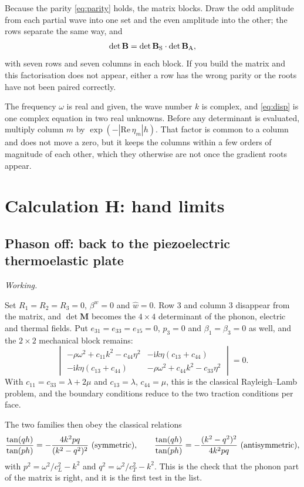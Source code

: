 \documentclass[11pt,a4paper]{article}
\newif\ifshowworked \showworkedtrue
\newenvironment{worked}{\ifshowworked\par\smallskip\noindent\textit{Working.}\par\else\setbox0\vbox\bgroup\fi}{\ifshowworked\par\smallskip\else\egroup\fi}
\newcommand{\ii}{\mathrm{i}}
\newcommand{\bw}{\hat w}
\newcommand{\bwth}{\beta^{w}}
\begin{document}
Because the parity \eqref{eq:parity} holds, the matrix blocks. Draw the odd amplitude from each partial wave
into one set and the even amplitude into the other; the rows separate the same way, and
\begin{equation}\label{eq:factor}
\det\mathbf B=\det\mathbf B_{\rm S}\cdot\det\mathbf B_{\rm A},
\end{equation}
with seven rows and seven columns in each block. If you build the matrix and this factorisation does not
appear, either a row has the wrong parity or the roots have not been paired correctly.

The frequency $\omega$ is real and given, the wave number $k$ is complex, and \eqref{eq:disp} is one complex
equation in two real unknowns. Before any determinant is evaluated, multiply column $m$ by
$\exp(-|\mathrm{Re}\,\eta_m|h)$. That factor is common to a column and does not move a zero, but it keeps the
columns within a few orders of magnitude of each other, which they otherwise are not once the gradient roots
appear.

\section{Calculation H: hand limits}\label{sec:H}

\subsection{Phason off: back to the piezoelectric thermoelastic plate}

\begin{worked}
Set $R_1=R_2=R_3=0$, $\bwth=0$ and $\bw=0$. Row 3 and column 3 disappear from the matrix, and
$\det\mathbf M$ becomes the $4\times4$ determinant of the phonon, electric and thermal fields. Put
$e_{31}=e_{33}=e_{15}=0$, $p_3=0$ and $\beta_1=\beta_3=0$ as well, and the $2\times2$ mechanical block
remains:
\[
\begin{vmatrix}-\rho\omega^2+c_{11}k^2-c_{44}\eta^2&-\ii k\eta(c_{13}+c_{44})\\
-\ii k\eta(c_{13}+c_{44})&-\rho\omega^2+c_{44}k^2-c_{33}\eta^2\end{vmatrix}=0 .
\]
With $c_{11}=c_{33}=\lambda+2\mu$ and $c_{13}=\lambda$, $c_{44}=\mu$, this is the classical Rayleigh--Lamb
problem, and the boundary conditions reduce to the two traction conditions per face.
\end{worked}

\noindent The two families then obey the classical relations
\begin{equation}\label{eq:RL}
\frac{\tan(qh)}{\tan(ph)}=-\frac{4k^2pq}{(k^2-q^2)^2}\ ({\rm symmetric}),\qquad
\frac{\tan(qh)}{\tan(ph)}=-\frac{(k^2-q^2)^2}{4k^2pq}\ ({\rm antisymmetric}),
\end{equation}
with $p^2=\omega^2/c_L^2-k^2$ and $q^2=\omega^2/c_T^2-k^2$. This is the check that the phonon part of the
matrix is right, and it is the first test in the list.
\end{document}
